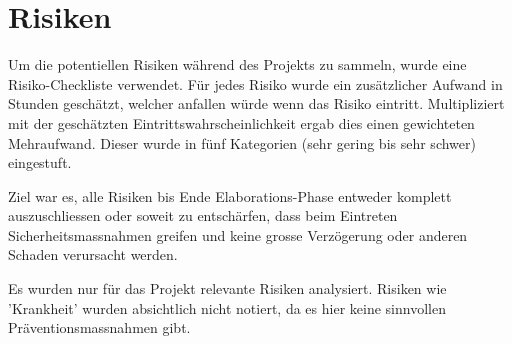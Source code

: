 \section{Risiken}\label{sec:risiken}

Um die potentiellen Risiken während des Projekts zu sammeln, wurde eine Risiko-Checkliste verwendet. Für jedes Risiko wurde ein zusätzlicher Aufwand in Stunden geschätzt, welcher anfallen würde wenn das Risiko eintritt. Multipliziert mit der geschätzten Eintrittswahrscheinlichkeit ergab dies einen gewichteten Mehraufwand. Dieser wurde in fünf Kategorien (sehr gering bis sehr schwer) eingestuft.

Ziel war es, alle Risiken bis Ende Elaborations-Phase entweder komplett auszuschliessen oder soweit zu entschärfen, dass beim Eintreten Sicherheitsmassnahmen greifen und keine grosse Verzögerung oder anderen Schaden verursacht werden.

Es wurden nur für das Projekt relevante Risiken analysiert. Risiken wie 'Krankheit' wurden absichtlich nicht notiert, da es hier keine sinnvollen Präventionsmassnahmen gibt.

